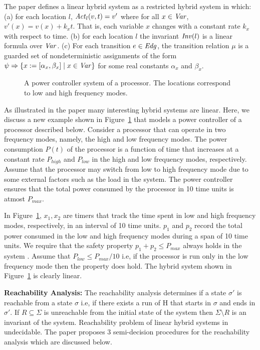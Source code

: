 The paper defines a linear hybrid system as a restricted hybrid system in which:
(a) for each location $l$, $\mathit{Act}_l(v,t) = v'$ where for all $x \in \mathit{Var}$, $v'(x) = v(x) + k_x t$. That is, each variable $x$ changes with a constant rate $k_x$ with respect to time.
(b) for each location $l$ the invariant $\mathit{Inv}(l)$ is a linear formula over $\mathit{Var}$.
(c) For each transition $e \in \mathit{Edg}$, the transition relation $\mu$ is a guarded set of nondeterministic assignments of the form $\psi \Rightarrow \{ x := [\alpha_x,\beta_x] \; | \; x \in \mathit{Var} \}$ for some real constants $\alpha_x$ and $\beta_x$.

\begin{figure}

\caption{A power controller system of a processor.  
The locations correspond to low and high frequency modes.} \label{fig:hsys}
\end{figure}

As illustrated in the paper many interesting hybrid systems are linear.
Here, we discuss a new example shown in  Figure~\ref{fig:hsys} that models a power controller 
of a processor described below.
Consider a processor that can operate in two frequency modes, namely, the high and low frequency modes.
The power consumption $P(t)$ of the processor is a function of time that increases at a constant rate $P_{high}$ and
$P_{low}$ in the high and low frequency modes, respectively. 
Assume that the processor may switch from low to high frequency mode due to some external factors such as the load in the 
system. The power controller ensures that the total power consumed by the processor in 10 time units is atmost $P_{max}$. 

In Figure~\ref{fig:hsys}, $x_1, x_2$ are timers that track the time spent in low and high frequency modes, respectively, in an interval of 10 time units.
$p_1$ and $p_2$ record the total power consumed in the low and high frequency modes during a span of 10 time units.
We require that the safety property $p_1 + p_2 \le P_{max}$ always holds in the system .
Assume that $P_{low} \le P_{max}/10$ i.e, if the processor is run only in the low frequency mode then the property does hold.
The hybrid system shown in Figure~\ref{fig:hsys} is clearly linear.

\textbf{Reachability Analysis:}
The reachability analysis determines if a state $\sigma'$ is reachable from a state $\sigma$ i.e, if there exists
a run of H that starts in $\sigma$ and ends in $\sigma'$. If $R \subseteq \Sigma$ is unreachable from the initial state of the system then $\Sigma \setminus R$ is an invariant of the system.
Reachability problem of linear hybrid systems in undecidable. The paper proposes 3 semi-decision procedures for 
the reachability analysis which are discussed below.

